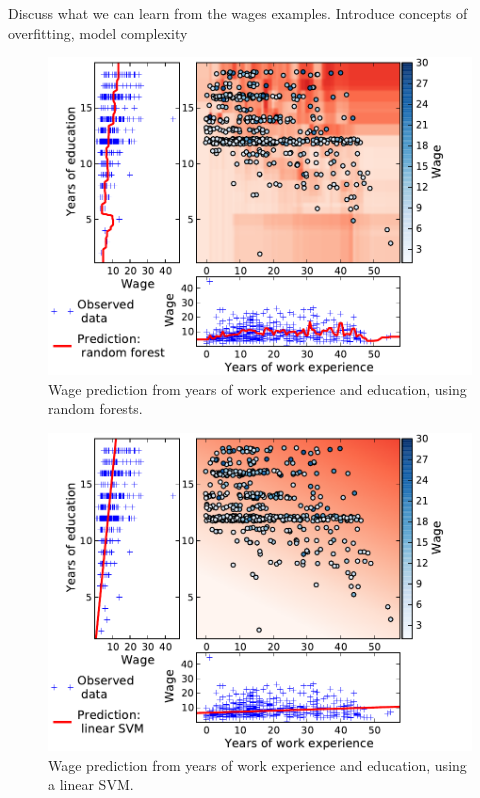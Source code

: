 \documentclass[a4paper]{article}
\begin{document}
Discuss what we can learn from the wages examples. Introduce concepts of
overfitting, model complexity


\begin{figure}[b]
    \includegraphics[width=1.05\linewidth]{wage_data_random_forest}%

    \caption{Wage prediction from years of work experience and education,
    using random forests.\label{fig:random_forest}}
\end{figure}

\begin{figure}[b]
    \hspace*{-.015\linewidth}%
    \includegraphics[width=1.05\linewidth]{wage_data_linear_svm}%

    \caption{Wage prediction from years of work experience and education,
    using a linear SVM.}
\end{figure}
\end{document}

